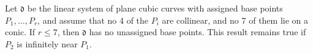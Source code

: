 Let $\mathfrak{d}$ be the linear system of plane cubic curves with assigned base points $P_1, \ldots, P_r$, and assume that no 4 of the $P_i$ are collinear, and no 7 of them lie on a conic. If $r \leqslant 7$, then $\mathfrak{d}$ has no unassigned base points. This result remains true if $P_2$ is infinitely near $P_1$.
